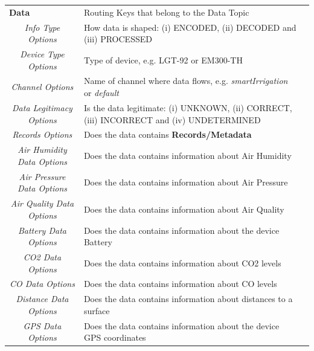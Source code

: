 \begin{landscape}
\begin{longtable}{cll}
   \multicolumn{1}{l}{\textbf{Data}}       & Routing Keys that belong to the Data Topic                                                                &  \\
   \textit{Info Type Options}              & How data is shaped: (i) ENCODED, (ii) DECODED and (iii) PROCESSED                                         &  \\
   \textit{Device Type Options}            & Type of device, e.g. LGT-92 or EM300-TH                                                                   &  \\
   \textit{Channel Options}                & Name of channel where data flows, e.g. \textit{smartIrrigation} or \textit{default}                       &  \\
   \textit{Data Legitimacy Options}        & Is the data legitimate: (i) UNKNOWN, (ii) CORRECT, (iii) INCORRECT and (iv) UNDETERMINED      &  \\
   \textit{Records Options}                & Does the data contains \textbf{Records/Metadata}\footnotemark[1]                                          &  \\
   \textit{Air Humidity Data Options}      & Does the data contains information about Air Humidity\footnotemark[1]\footnotemark[2]                     &  \\
   \textit{Air Pressure Data Options}      & Does the data contains information about Air Pressure\footnotemark[1]\footnotemark[2]                     &  \\
   \textit{Air Quality Data Options}       & Does the data contains information about Air Quality\footnotemark[1]\footnotemark[2]                      &  \\
   \textit{Battery Data Options}           & Does the data contains information about the device Battery\footnotemark[1]\footnotemark[2]               &  \\
   \textit{CO2 Data Options}               & Does the data contains information about CO2 levels\footnotemark[1]\footnotemark[2]                       &  \\
   \textit{CO Data Options}                & Does the data contains information about CO levels\footnotemark[1]\footnotemark[2]                        &  \\
   \textit{Distance Data Options}          & Does the data contains information about distances to a surface\footnotemark[1]\footnotemark[2]           &  \\
   \textit{GPS Data Options}               & Does the data contains information about the device GPS coordinates\footnotemark[1]\footnotemark[2]       &  \\

\end{longtable}
\end{landscape}
